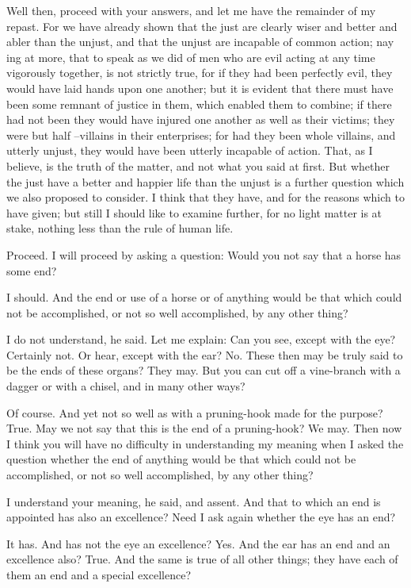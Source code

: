 Well then, proceed with your answers, and let me have the remainder of my repast. For we have already shown that the just are clearly wiser and better and abler than the unjust, and that the unjust are incapable of common action; nay ing at more, that to speak as we did of men who are evil acting at any time vigorously together, is not strictly true, for if they had been perfectly evil, they would have laid hands upon one another; but it is evident that there must have been some remnant of justice in them, which enabled them to combine; if there had not been they would have injured one another as well as their victims; they were but half --villains in their enterprises; for had they been whole villains, and utterly unjust, they would have been utterly incapable of action. That, as I believe, is the truth of the matter, and not what you said at first. But whether the just have a better and happier life than the unjust is a further question which we also proposed to consider. I think that they have, and for the reasons which to have given; but still I should like to examine further, for no light matter is at stake, nothing less than the rule of human life.

Proceed.
I will proceed by asking a question: Would you not say that a horse has some end?

I should.
And the end or use of a horse or of anything would be that which could not be accomplished, or not so well accomplished, by any other thing?

I do not understand, he said.
Let me explain: Can you see, except with the eye?
Certainly not.
Or hear, except with the ear?
No.
These then may be truly said to be the ends of these organs?
They may.
But you can cut off a vine-branch with a dagger or with a chisel, and in many other ways?

Of course.
And yet not so well as with a pruning-hook made for the purpose?
True.
May we not say that this is the end of a pruning-hook?
We may.
Then now I think you will have no difficulty in understanding my meaning when I asked the question whether the end of anything would be that which could not be accomplished, or not so well accomplished, by any other thing?

I understand your meaning, he said, and assent.
And that to which an end is appointed has also an excellence? Need I ask again whether the eye has an end?

It has.
And has not the eye an excellence?
Yes.
And the ear has an end and an excellence also?
True.
And the same is true of all other things; they have each of them an end and a special excellence?


